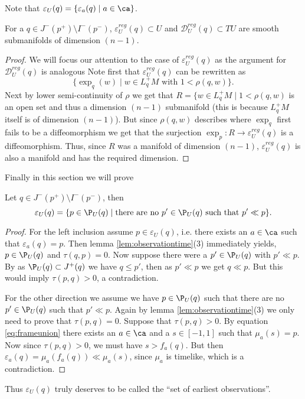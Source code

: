 Note that $\varepsilon_U(q) = \{ \varepsilon_a(q) \mid a\in \ca \}$.

\begin{proposition} For a $q\in J^-(p^+)\setminus I^-(p^-)$, $\varepsilon^{reg}_U(q)\subset U$ and $\mathcal{D}^{reg}_U(q)\subset TU$ are smooth submanifolds of dimension $(n-1)$.
\end{proposition}
\begin{proof}
We will focus our attention to the case of $\varepsilon^{reg}_U(q)$ as the argument for  $\mathcal{D}^{reg}_U(q)$ is analogous
Note first that $\varepsilon^{reg}_U(q)$ can be rewritten as 
\[
    \{\exp_q(w) \mid  w\in L^+_qM \text{ with } 1<\rho(q,w)\}.
\]
Next by lower semi-continuity of $\rho$ we get that $R=\{w\in L^+_qM \mid 1<\rho(q,w)$ is an open set and thus a dimension $(n-1)$ submanifold (this is because $L^+_qM$ itself is of dimension $(n-1)$). But since $\rho(q,w)$ describes where $\exp_q$ first fails to be a diffeomorphism we get that the surjection $\exp_p:R\to \varepsilon^{reg}_U(q)$ is a diffeomorphism. Thus, since $R$ was a manifold of dimension $(n-1)$, $\varepsilon^{reg}_U(q)$ is also a manifold and has the required dimension.
\end{proof}

Finally in this section we will prove
\begin{proposition}\label{prop:seocharact}
Let $q\in J^-(p^+)\setminus I^-(p^-)$, then 
\begin{equation*}
    \varepsilon_U(q) = \{ p \in \P_U(q) \mid \text{there are no $p'\in \P_U(q)$ such that $p'\ll p$} \}.
\end{equation*}
\end{proposition}
\begin{proof}
For the left inclusion assume $p\in \varepsilon_U(q)$, i.e. there exists an $a\in \ca$ such that $\varepsilon_a(q)=p$. Then lemma \ref{lem:observationtime}(3) immediately yields, $p\in \P_U(q)$ and  $\tau(q,p)=0$. Now suppose there were a $p'\in \P_U(q)$ with $p'\ll p$. By as $\P_U(q)\subset J^+(q)$ we have $q\leq p'$, then as $p'\ll p$ we get $q\ll p$. But this would imply $\tau(p,q)>0$, a contradiction.

For the other direction we assume we have $p \in \P_U(q)$ such that there are no $p'\in\P_U(q)$ such that $p'\ll p$. Again by lemma \ref{lem:observationtime}(3) we only need to prove that $\tau(p,q)=0$. Suppose that $\tau(p,q)>0$. By equation \ref{eq:frameunion} there exists an $a\in \ca$ and a $s\in [-1,1]$ such that $\mu_a(s) = p$. Now since $\tau(p,q)>0$, we must have $s > f_a(q)$. But then $\varepsilon_a(q) = \mu_a(f_a(q)) \ll  \mu_a(s)$, since $\mu_a$ is timelike, which is a contradiction.
\end{proof}
Thus $\varepsilon_U(q)$ truly deserves to be called the \enquote{set of earliest observations}.

